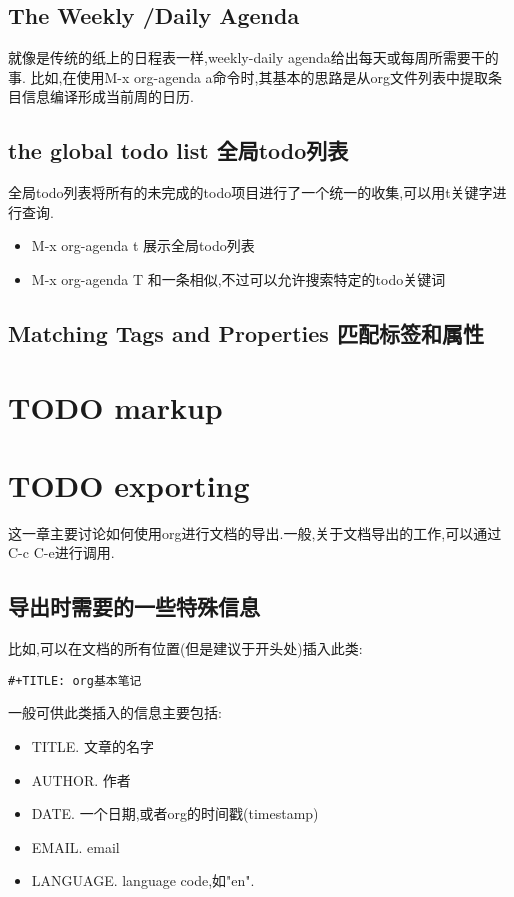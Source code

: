 \documentclass[10pt,a4paper]{article}
\begin{document}
\subsection{The Weekly /Daily  Agenda}
\label{sec:org6c1a42a}
就像是传统的纸上的日程表一样,weekly-daily agenda给出每天或每周所需要干的事.
比如,在使用M-x org-agenda a命令时,其基本的思路是从org文件列表中提取条目信息编译形成当前周的日历.
\subsection{the global todo list 全局todo列表}
\label{sec:orgab97d41}
全局todo列表将所有的未完成的todo项目进行了一个统一的收集,可以用t关键字进行查询.
\begin{itemize}
\item M-x org-agenda t 展示全局todo列表
\item M-x org-agenda T 和一条相似,不过可以允许搜索特定的todo关键词
\end{itemize}
\subsection{Matching Tags and Properties 匹配标签和属性}
\label{sec:orgc4c92ca}
\section{{\bfseries\sffamily TODO} markup}
\label{sec:orgedb5766}

\section{{\bfseries\sffamily TODO} exporting}
\label{sec:org1e4b6d9}
这一章主要讨论如何使用org进行文档的导出.一般,关于文档导出的工作,可以通过C-c C-e进行调用.


\subsection{导出时需要的一些特殊信息}
\label{sec:orgce04601}
比如,可以在文档的所有位置(但是建议于开头处)插入此类:

\begin{verbatim}
#+TITLE: org基本笔记
\end{verbatim}

一般可供此类插入的信息主要包括:
\begin{itemize}
\item TITLE. 文章的名字
\item AUTHOR. 作者
\item DATE. 一个日期,或者org的时间戳(timestamp)
\item EMAIL. email
\item LANGUAGE. language code,如"en".
\end{itemize}
\end{document}
